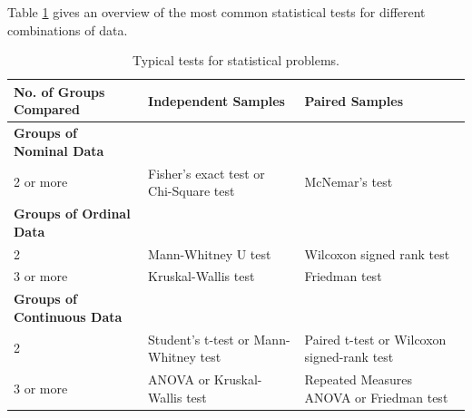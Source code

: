 Table \ref{table:tests} gives an overview of the most common statistical tests for different combinations of data.
\begin{table}
  \centering
  \footnotesize{
  \begin{tabular}{ | p{5cm} || p{5cm} | p{5cm} | }
     \hline
     No. of Groups Compared  & \textbf{Independent Samples} & \textbf{Paired Samples} \\ \hline
     \textbf{Groups of Nominal Data} & & \\ \hline
     2 or more & Fisher's exact test or Chi-Square test & McNemar's test \\ \hline
     \textbf{Groups of Ordinal Data} & & \\ \hline
     2 & Mann-Whitney U test & Wilcoxon signed rank test \\ \hline
     3 or more & Kruskal-Wallis test & Friedman test \\ \hline
     \textbf{Groups of Continuous Data} & & \\ \hline
     2 & Student's t-test or Mann-Whitney test & Paired t-test or Wilcoxon signed-rank test \\ \hline
     3 or more & ANOVA or Kruskal-Wallis test & Repeated Measures ANOVA or Friedman test \\ \hline

  \end{tabular}
  }

  \caption{Typical tests for statistical problems.}\label{table:tests}
\end{table}

